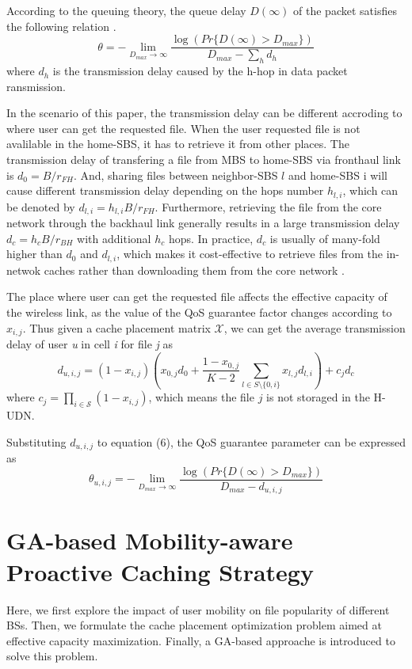 \documentclass[conference]{IEEEtran}
\begin{document}
According to the queuing theory, the queue delay $D(\infty)$ of the packet satisfies the following relation \cite{1363841}.
\begin{equation}
\theta=-\lim_{D_{max}\to \infty}\frac{\log(Pr\{D(\infty)>D_{max}\})}{D_{max}-\sum_h d_h}
\end{equation}
where $d_h$ is the transmission delay caused by the h-hop in data packet ransmission.

In the scenario of this paper, the transmission delay can be different accroding to where user can get the requested file. When the user requested file is not avalilable in the home-SBS, it has to retrieve it from other places. The transmission delay of transfering a file from MBS to home-SBS via fronthaul link is $d_0={B}/{r_{FH}}$. And, sharing files between neighbor-SBS $l$ and home-SBS i will cause different transmission delay depending on the hops number $h_{l,i}$, which can be denoted by $d_{l,i}=h_{l,i}{B}/{r_{FH}}$. Furthermore, retrieving the file from the core network through the backhaul link generally results in a large transmission delay $d_c=h_c{B}/{r_{BH}}$ with additional $h_c$ hops. In practice, $d_c$ is usually of many-fold higher than $d_0$ and $d_{l,i}$, which makes it cost-effective to retrieve files from the in-netwok caches rather than downloading them from the core network \cite{6736753}.

The place where user can get the requested file affects the effective capacity of the wireless link, as the value of the QoS guarantee factor changes according to $x_{i,j}$. Thus given a cache placement matrix $\mathcal{X}$, we can get the average transmission delay of user \emph{u} in cell \emph{i} for file \emph{j} as
\begin{equation}
d_{u,i,j}=(1-x_{i,j})(x_{0,j}d_0+\frac{1-x_{0,j}}{K-2}\sum_{l\in S\setminus{\{0,i\}}}x_{l,j}d_{l,i})+c_jd_c
\end{equation}
where $c_j= \prod_{i\in \mathcal{S}}(1-x_{i,j})$, which means the file $j$ is not storaged in the H-UDN.

Substituting $d_{u,i,j}$ to equation (6), the QoS guarantee parameter can be expressed as
\begin{equation}
\theta_{u,i,j}=-\lim_{D_{max}\to \infty}\frac{\log(Pr\{D(\infty)>D_{max}\})}{D_{max}- d_{u,i,j}}
\end{equation}

\section{GA-based Mobility-aware Proactive Caching Strategy}
Here, we first explore the impact of user mobility on file popularity of different BSs. Then, we formulate the cache placement optimization problem aimed at effective capacity maximization. Finally, a GA-based approache is introduced to solve this problem.
\end{document}
